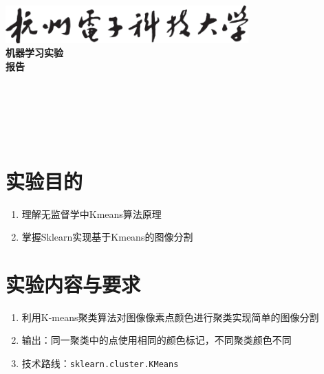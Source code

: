 \documentclass[a4paper]{ctexart}
\begin{document}
  \begin{titlepage}
      \songti
      \begin{center}
        \vspace*{2cm}
        \includegraphics[width=0.7\textwidth]{../HDU.png}\\
        \vspace*{1cm}
        {\fontsize{36pt}{0}
          \textbf{机器学习实验\\报\quad 告\\}
        }
        \vspace*{12cm}
        {\fontsize{18pt}{0}
           \underline{}\\
          \vspace*{0.5cm}
           \underline{}\\
          \vspace*{0.5cm}
           \underline{}\\
          \vspace*{0.5cm}
           \underline{}\\
          \vspace*{0.5cm}
           \underline{}\\
        }
      \end{center}
  \end{titlepage}


  \newpage
  \section{实验目的}
    \begin{enumerate}
      \item 理解无监督学中Kmeans算法原理
      \item 掌握Sklearn实现基于Kmeans的图像分割
    \end{enumerate}

  \section{实验内容与要求}
    \begin{enumerate}
      \item 利用K-means聚类算法对图像像素点颜色进行聚类实现简单的图像分割
      \item 输出：同一聚类中的点使用相同的颜色标记，不同聚类颜色不同
      \item 技术路线：\verb|sklearn.cluster.KMeans|
    \end{enumerate}
\end{document}
